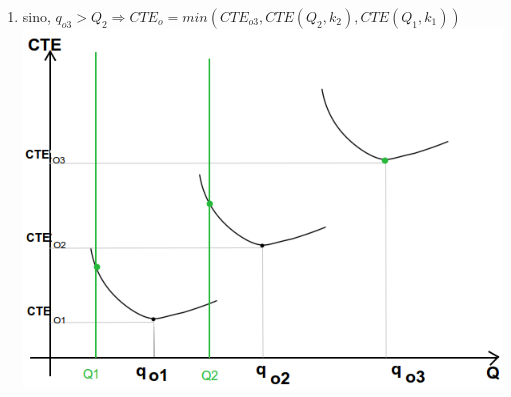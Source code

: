 \documentclass{article}
\begin{document}
\begin{enumerate}
 \item sino, $q_{o3} > Q_2 \Rightarrow CTE_o = min( CTE_{o3}, CTE(Q_2, k_2), CTE(Q_1, k_1) )$ \\
      \includegraphics[scale=0.5,keepaspectratio=true]{img/8/8_QvsCTE_3.png} 
\end{enumerate}
\end{document}
